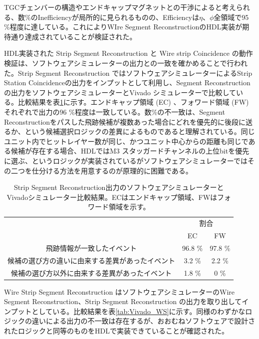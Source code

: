 TGCチェンバーの構造やエンドキャップマグネットとの干渉によると考えられる、数\%のInefficiencyが局所的に見られるものの、Efficiencyは$\eta$、$\phi$全領域で95 \%程度に達している。これによりWIre Segment ReconstructionのHDL実装が期待通り達成されていることが検証された。

HDL実装された Strip Segment Reconstruction と Wire strip Coincidence の動作検証は、ソフトウェアシミュレーターの出力との一致を確かめることで行われた。Strip Segment Reconstruction ではソフトウェアシミュレーターによるStrip Station Coincidenceの出力をインプットとして利用し、Segment Reconstruction の出力をソフトウェアシミュレーターとVivado シミュレーターで比較している。比較結果を表\ref{tab:Vivado_strip}に示す。エンドキャップ領域 (EC) 、フォワード領域 (FW)それぞれで出力の96 \%程度は一致している。数\%の不一致は、Segment Reconstructionをパスした飛跡候補が複数あった場合にどれを優先的に後段に送るか、という候補選択ロジックの差異によるものであると理解されている。同じユニット内でヒットレイヤー数が同じ、かつユニット中心からの距離も同じである候補が存在する場合、HDLではM3 スタッガードチャンネルの上位bitを優先に選ぶ、というロジックが実装されているがソフトウェアシミュレーターではその二つを仕分ける方法を用意するのが原理的に困難である。


\begin{table}[]
    \centering
    \caption*{Strip Segment Reconstruction出力のソフトウェアシミュレーターとVivadoシミュレーター比較結果。ECはエンドキャップ領域、FWはフォワード領域を示す。\cite{mt_kawamoto}}
    \label{tab:Vivado_strip}
    \begin{tabular}{|c|cc|}
    \hline
    \multirow{2}{*}{}        & \multicolumn{2}{c|}{割合}                \\ \cline{2-3} 
                             & \multicolumn{1}{c|}{EC}      & FW      \\ \hline\hline
    飛跡情報が一致したイベント            & \multicolumn{1}{c|}{96.8 \%} & 97.8 \% \\ \hline
    候補の選び方の違いに由来する差異があったイベント & \multicolumn{1}{c|}{3.2 \%}  & 2.2 \%  \\ \hline
    候補の選び方以外に由来する差異があったイベント  & \multicolumn{1}{c|}{1.8 \%}  & 0 \%    \\ \hline
    \end{tabular}
\end{table}

Wire Strip Segment Reconstruction はソフトウェアシミュレーターのWire Segment Reconstruction、Strip Segment Reconstruction の出力を取り出してインプットとしている。比較結果を表\ref{tab:Vivado_WS}に示す。同様のわずかなロジックの違いによる出力の不一致は存在するが、おおむねソフトウェアで設計されたロジックと同等のものをHDLで実装できていることが確認された。

